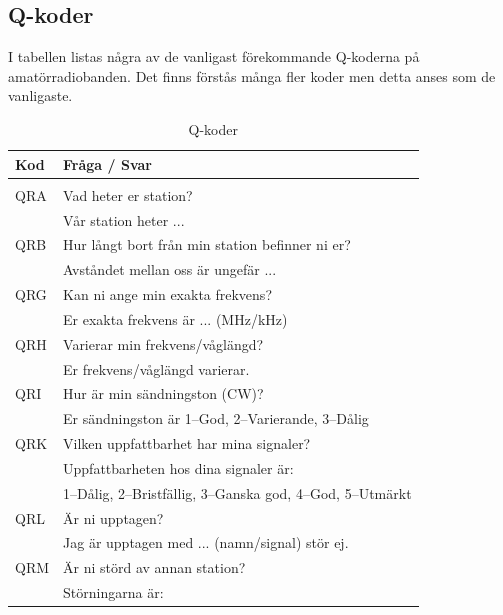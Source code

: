 \subsection{Q-koder}
I tabellen listas några av de vanligast förekommande Q-koderna på amatörradiobanden. Det finns förstås många fler koder men detta anses som de vanligaste.
\begin{longtable}{ll}
	\textbf{Kod} & \textbf{Fråga / Svar}                                                         \\ \hline 
	\endhead
	\caption{Q-koder}\\    
\endlastfoot
	QRA & Vad heter er station?                                                \\
	    & Vår station heter ...                                                \\ \hline
	QRB & Hur långt bort från min station befinner ni er?                      \\
	    & Avståndet mellan oss är ungefär ...                                  \\ \hline
	QRG & Kan ni ange min exakta frekvens?                                     \\
	    & Er exakta frekvens är ... (MHz/kHz)                                  \\ \hline
	QRH & Varierar min frekvens/våglängd?                                      \\
	    & Er frekvens/våglängd varierar.                                       \\ \hline
	QRI & Hur är min sändningston (CW)?                                        \\
	    & Er sändningston är 1--God, 2--Varierande, 3--Dålig                   \\ \hline
	QRK & Vilken uppfattbarhet har mina signaler?                              \\
	    & Uppfattbarheten hos dina signaler är:                                \\
	    & 1--Dålig, 2--Bristfällig, 3--Ganska god, 4--God, 5--Utmärkt          \\ \hline
	QRL & Är ni upptagen?                                                      \\
	    & Jag är upptagen med ... (namn/signal) stör ej.                       \\ \hline
	QRM & Är ni störd av annan station?                                        \\
	    & Störningarna är:                                                     \\

\end{longtable}
